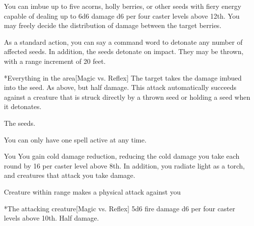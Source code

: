 \begin{spellheader}
\end{spellheader}
\begin{spelleffects}
    \spelleffect You can imbue up to five acorns, holly berries, or other seeds with fiery energy capable of dealing up to 6d6 damage \add d6 per four caster levels above 12th. You may freely decide the distribution of damage between the target berries.

    As a standard action, you can say a command word to detonate any number of affected seeds. In addition, the seeds detonate on impact. They may be thrown, with a range increment of 20 feet.
    \begin{spelltarget}*{Everything in the area}[Magic vs. Reflex]
        \spellsuccess The target takes the damage imbued into the seed.
        \spellfailure As above, but half damage.
        \spellspecial This attack automatically succeeds against a creature that is struck directly by a thrown seed or holding a seed when it detonates.
    \end{spelltarget}
     The seeds.
\end{spelleffects}
\begin{spellfooter}
    \spellnotes You can only have one  spell active at any time.
\end{spellfooter}

\begin{spellheader}
    \spelldur{\durshort \dismissable}
\end{spellheader}
\begin{spelleffects}
    \begin{spelltarget}{You}
        \spelleffect You gain cold damage reduction, reducing the cold damage you take each round by 16  per caster level above 8th. In addition, you radiate light as a torch, and creatures that attack you take damage.
    \end{spelltarget}
    \begin{spelltrigger}{Creature within \rngclose range makes a physical attack against you}
        \begin{spelltarget}*{The attacking creature}[Magic vs. Reflex]
            \spellsuccess 5d6 fire damage \add d6 per four caster levels above 10th.
            \spellfailure Half damage.
        \end{spelltarget}
    \end{spelltrigger}
\end{spelleffects}

